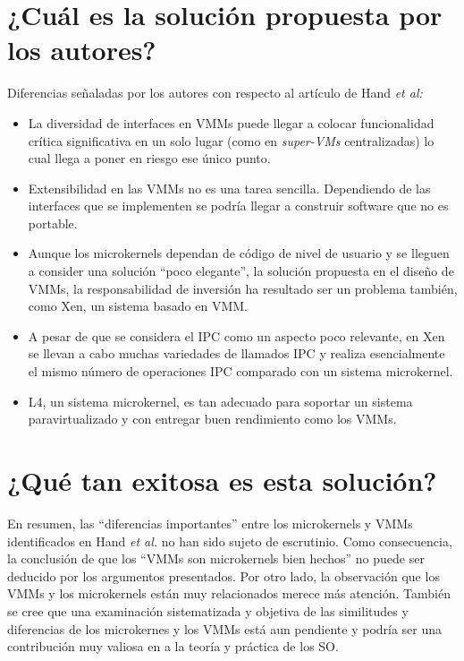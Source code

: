 \section{¿Cuál es la solución propuesta por los autores?}
Diferencias señaladas por los autores con respecto al artículo de Hand \emph{et al:}
\begin{itemize}
    \item La diversidad de interfaces en VMMs puede llegar a colocar funcionalidad crítica significativa en un solo lugar (como en \emph{super-VMs} centralizadas) lo cual llega a poner en riesgo ese único punto.
    \item Extensibilidad en las VMMs no es una tarea sencilla. Dependiendo de las interfaces que se implementen se podría llegar a construir software que no es portable.
    \item Aunque los microkernels dependan de código de nivel de usuario y se lleguen a consider una solución ``poco elegante'', la solución propuesta en el diseño de VMMs, la responsabilidad de inversión ha resultado ser un problema también, como Xen, un sistema basado en VMM.
    \item A pesar de que se considera el IPC como un aspecto poco relevante, en Xen se llevan a cabo muchas variedades de llamados IPC y realiza esencialmente el mismo número de operaciones IPC comparado con un sistema microkernel.
    \item L4, un sistema microkernel, es tan adecuado para soportar un sistema paravirtualizado y con entregar buen rendimiento como los VMMs.
\end{itemize}


\section{¿Qué tan exitosa es esta solución?} 
En resumen, las ``diferencias importantes'' entre los microkernels y VMMs identificados en Hand \emph{et al.} no han sido sujeto de escrutinio. Como consecuencia, la conclusión de que los ``VMMs son microkernels bien hechos'' no puede ser deducido por los argumentos presentados. Por otro lado, la observación que los VMMs y los microkernels están muy relacionados merece más atención. También se cree que una examinación sistematizada y objetiva de las similitudes y diferencias de los microkernes y los VMMs está aun pendiente y podría ser una contribución muy valiosa en a la teoría y práctica de los SO.





















